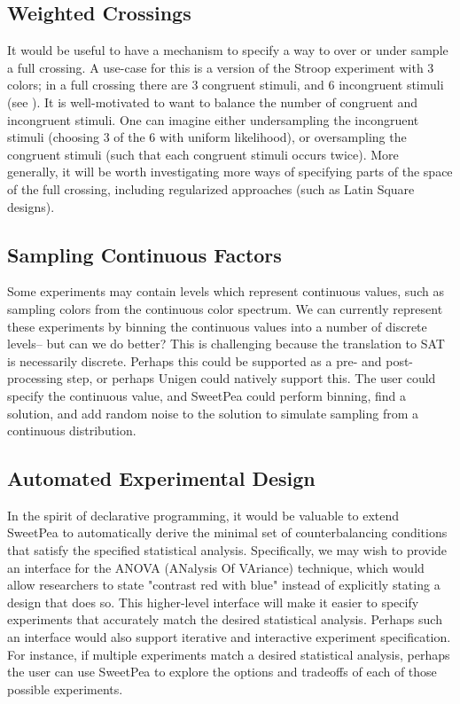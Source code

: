 \subsection{Weighted Crossings}
It would be useful to have a mechanism to specify a way to over or under sample a full crossing. A use-case for this is a version of the Stroop experiment with 3 colors; in a full crossing there are 3 congruent stimuli, and 6 incongruent stimuli (see ). It is well-motivated to want to balance the number of congruent and incongruent stimuli. One can imagine either undersampling the incongruent stimuli (choosing 3 of the 6 with uniform likelihood), or oversampling the congruent stimuli (such that each congruent stimuli occurs twice). More generally, it will be worth investigating more ways of specifying parts of the space of the full crossing, including regularized approaches (such as Latin Square designs).


\subsection{Sampling Continuous Factors}
Some experiments may contain levels which represent continuous values, such as sampling colors from the continuous color spectrum. We can currently represent these experiments by binning the continuous values into a number of discrete levels-- but can we do better? This is challenging because the translation to SAT is necessarily discrete. Perhaps this could be supported as a pre- and post- processing step, or perhaps Unigen could natively support this. The user could specify the continuous value, and SweetPea could perform binning, find a solution, and add random noise to the solution to simulate sampling from a continuous distribution.

\subsection{Automated Experimental Design}
In the spirit of declarative programming, it would be valuable to extend SweetPea to automatically derive the minimal set of counterbalancing conditions that satisfy the specified statistical analysis. Specifically, we may wish to provide an interface for the ANOVA (ANalysis Of VAriance) technique, which would allow researchers to state "contrast red with blue" instead of explicitly stating a design that does so. This higher-level interface will make it easier to specify experiments that accurately match the desired statistical analysis. Perhaps such an interface would also support iterative and interactive experiment specification. For instance, if multiple experiments match a desired statistical analysis, perhaps the user can use SweetPea to explore the options and tradeoffs of each of those possible experiments.

